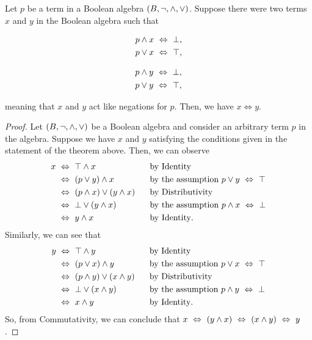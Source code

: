 \begin{theorem}\label{thm:unique}
    Let $p$ be a term in a Boolean algebra $(B, \neg, \wedge, \vee)$.
    Suppose there were two terms $x$ and $y$ in the Boolean algebra such that
    \begin{center}
        \begin{minipage}{.2\linewidth}
            \begin{align*}
                p \wedge x &~\Leftrightarrow~ \bot,\\
                p \vee x &~\Leftrightarrow~ \top,
            \end{align*}
        \end{minipage}%
        \begin{minipage}{.2\linewidth}
            \begin{align*}
                p \wedge y &~\Leftrightarrow~ \bot,\\
                p \vee y &~\Leftrightarrow~ \top,
            \end{align*}
        \end{minipage}
    \end{center}
    meaning that $x$ and $y$ act like negations for $p$.
    Then, we have $x \iff y$.
\end{theorem}
\begin{proof}
    Let $(B, \neg, \wedge, \vee)$ be a Boolean algebra
    and consider an arbitrary term $p$ in the algebra.
    Suppose we have $x$ and $y$ satisfying the conditions given in the statement of the theorem above.
    Then, we can observe
    \begin{alignat*}{2}
        x &~\Leftrightarrow~ \top \wedge x ~~~~~~~~~~~~~~~~&&\text{by Identity}\\
          &~\Leftrightarrow~ (p \vee y) \wedge x &&\text{by the assumption $p \vee y ~\Leftrightarrow~ \top$}\\
          &~\Leftrightarrow~ (p \wedge x) \vee (y \wedge x) &&\text{by Distributivity}\\
          &~\Leftrightarrow~ \bot \vee (y \wedge x) &&\text{by the assumption $p \wedge x ~\Leftrightarrow~ \bot$}\\
          &~\Leftrightarrow~ y \wedge x &&\text{by Identity}.
    \end{alignat*}
    Similarly, we can see that
    \begin{alignat*}{2}
        y &~\Leftrightarrow~ \top \wedge y ~~~~~~~~~~~~~~~~&&\text{by Identity}\\
          &~\Leftrightarrow~ (p \vee x) \wedge y &&\text{by the assumption $p \vee x ~\Leftrightarrow~ \top$}\\
          &~\Leftrightarrow~ (p \wedge y) \vee (x \wedge y) &&\text{by Distributivity}\\
          &~\Leftrightarrow~ \bot \vee (x \wedge y) &&\text{by the assumption $p \wedge y ~\Leftrightarrow~ \bot$}\\
          &~\Leftrightarrow~ x \wedge y &&\text{by Identity}.
    \end{alignat*}
    So, from Commutativity, we can conclude that $x ~\Leftrightarrow~ (y \wedge x) ~\Leftrightarrow~ (x \wedge y) ~\Leftrightarrow~ y$.
\end{proof}

